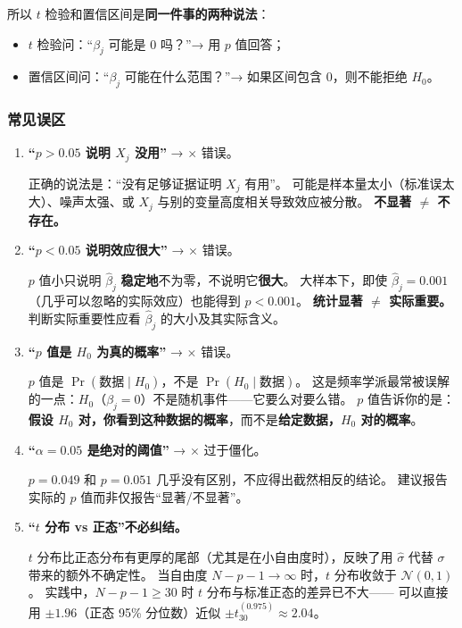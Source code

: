 所以 $t$ 检验和置信区间是\textbf{同一件事的两种说法}：
\begin{itemize}
    \item $t$ 检验问：``$\beta_j$ 可能是 0 吗？''→ 用 $p$ 值回答；
    \item 置信区间问：``$\beta_j$ 可能在什么范围？''→ 如果区间包含 0，则不能拒绝 $H_0$。
\end{itemize}

\subsubsection{常见误区}

\begin{enumerate}[label=(\arabic*)]
    \item \textbf{``$p > 0.05$ 说明 $X_j$ 没用''} → {\scriptsize $\times$} 错误。
    
    正确的说法是：``没有足够证据证明 $X_j$ 有用''。
    可能是样本量太小（标准误太大）、噪声太强、或 $X_j$ 与别的变量高度相关导致效应被分散。
    \textbf{不显著 $\neq$ 不存在。}

    \item \textbf{``$p < 0.05$ 说明效应很大''} → {\scriptsize $\times$} 错误。
    
    $p$ 值小只说明 $\hat{\beta}_j$ \textbf{稳定地}不为零，不说明它\textbf{很大}。
    大样本下，即使 $\hat{\beta}_j = 0.001$（几乎可以忽略的实际效应）也能得到 $p < 0.001$。
    \textbf{统计显著 $\neq$ 实际重要。} 判断实际重要性应看 $\hat{\beta}_j$ 的大小及其实际含义。

    \item \textbf{``$p$ 值是 $H_0$ 为真的概率''} → {\scriptsize $\times$} 错误。
    
    $p$ 值是 $\Pr(\text{数据} \mid H_0)$，不是 $\Pr(H_0 \mid \text{数据})$。
    这是频率学派最常被误解的一点：$H_0$（$\beta_j = 0$）不是随机事件——它要么对要么错。
    $p$ 值告诉你的是：\textbf{假设 $H_0$ 对，你看到这种数据的概率}，而不是\textbf{给定数据，$H_0$ 对的概率}。

    \item \textbf{``$\alpha = 0.05$ 是绝对的阈值''} → {\scriptsize $\times$} 过于僵化。
    
    $p = 0.049$ 和 $p = 0.051$ 几乎没有区别，不应得出截然相反的结论。
    建议报告实际的 $p$ 值而非仅报告``显著/不显著''。

    \item \textbf{``$t$ 分布 vs 正态''不必纠结。}
    
    $t$ 分布比正态分布有更厚的尾部（尤其是在小自由度时），反映了用 $\hat{\sigma}$ 代替 $\sigma$ 带来的额外不确定性。
    当自由度 $N-p-1 \to \infty$ 时，$t$ 分布收敛于 $\mathcal{N}(0, 1)$。
    实践中，$N-p-1 \ge 30$ 时 $t$ 分布与标准正态的差异已不大——
    可以直接用 $\pm 1.96$（正态 95\% 分位数）近似 $\pm t_{30}^{(0.975)} \approx 2.04$。
\end{enumerate}


